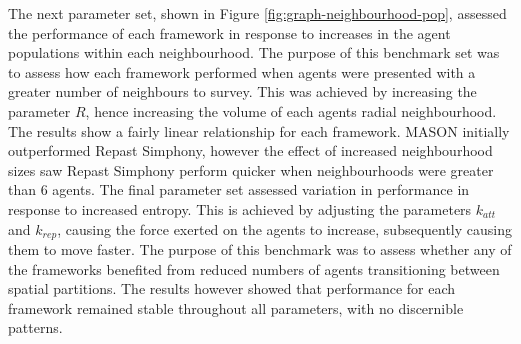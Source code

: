   The next parameter set, shown in Figure \ref{fig:graph-neighbourhood-pop}, assessed the performance of each framework in response to increases in the agent populations within each neighbourhood. The purpose of this benchmark set was to assess how each framework performed when agents were presented with a greater number of neighbours to survey. This was achieved by increasing the parameter $R$, hence increasing the volume of each agents radial neighbourhood. The results show a fairly linear relationship for each framework. MASON initially outperformed Repast Simphony, however the effect of increased neighbourhood sizes saw Repast Simphony perform quicker when neighbourhoods were greater than 6 agents.
  The final parameter set assessed variation in performance in response to increased entropy. This is achieved by adjusting the parameters $k_{att}$ and $k_{rep}$, causing the force exerted on the agents to increase, subsequently causing them to move faster.
  The purpose of this benchmark was to assess whether any of the frameworks benefited from reduced numbers of agents transitioning between spatial partitions. The results however showed that performance for each framework remained stable throughout all parameters, with no discernible patterns.
